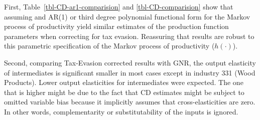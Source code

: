 \documentclass[
  12pt]{article}
\theoremstyle{definition}
\theoremstyle{remark}
\begin{document}
\begin{table}

\caption{\label{tbl-CD-comparision}Cobb-Douglas production function
parameters estimates, correcting intermediates ---raw materials--- for
tax evasion vs.~naive estimation and OLS. \(h\) is a third degree
polynomial for both `Tax Evasion + GNR' and `GNR'.
\(Z=\{k_{it},l_{it}\}\).}


\end{table}%

First, Table~\ref{tbl-CD-ar1-comparision} and \ref{tbl-CD-comparision}
show that assuming and AR(1) or third degree polynomial functional form
for the Markov process of productivity yield similar estimates of the
production function parameters when correcting for tax evasion.
Reassuring that results are robust to this parametric specification of
the Markov process of productivity (\(h(\cdot)\)).

Second, comparing Tax-Evasion corrected results with GNR, the output
elasticity of intermediates is significant smaller in most cases except
in industry 331 (Wood Products). Lower output elasticities for
intermediates were expected. The one that is higher might be due to the
fact that CD estimates might be subject to omitted variable bias because
it implicitly assumes that cross-elasticities are zero. In other words,
complementarity or substitutability of the inputs is ignored.
\end{document}
